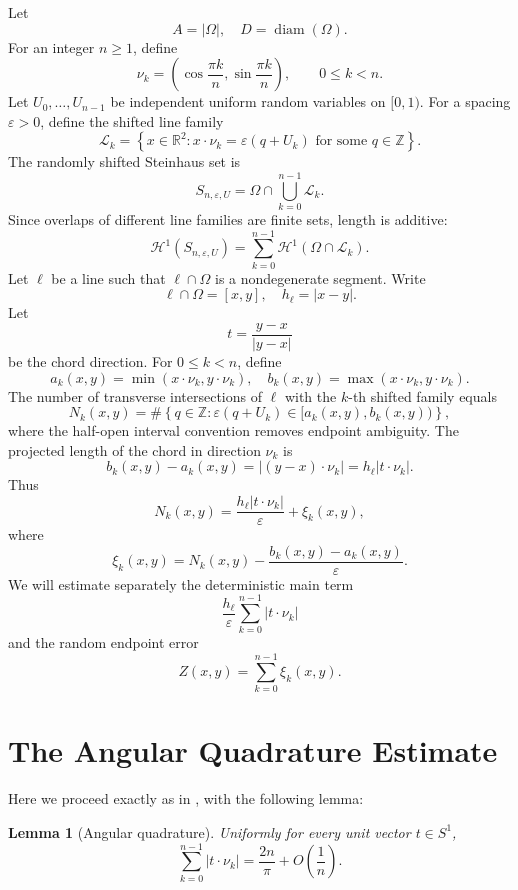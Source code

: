 \documentclass[11pt]{article}
\newtheorem{lemma}[theorem]{Lemma}
\newcommand{\R}{\mathbb R}
\newcommand{\Z}{\mathbb Z}
\newcommand{\cH}{\mathcal H}
\newcommand{\eps}{\varepsilon}
\newcommand{\diam}{\operatorname{diam}}
\begin{document}
Let
\[
        A=|\Omega|,
        \quad
        D=\diam(\Omega).
\]
For an integer $n\ge1$, define
\[
        \nu_k
        =
        \left(
        \cos\frac{\pi k}{n},
        \sin\frac{\pi k}{n}
        \right),
        \qquad
        0\le k<n.
\]
Let $U_0,\dots,U_{n-1}$ be independent uniform random variables on $[0,1)$. For a spacing $\eps>0$, define the shifted line family
\[
        \mathcal L_k
        =
        \left\{
        x\in\R^2:
        x\cdot\nu_k=\eps(q+U_k)
        \text{ for some }q\in\Z
        \right\}.
\]
The randomly shifted Steinhaus set is
\[
        S_{n,\eps,U}
        =
        \Omega\cap\bigcup_{k=0}^{n-1}\mathcal L_k.
\]
Since overlaps of different line families are finite sets, length is additive:
\[
        \cH^1(S_{n,\eps,U})
        =
        \sum_{k=0}^{n-1}
        \cH^1(\Omega\cap\mathcal L_k).
\]
Let $\ell$ be a line such that $\ell\cap\Omega$ is a nondegenerate segment. Write
\[
        \ell\cap\Omega=[x,y],
        \quad
        h_\ell=|x-y|.
\]
Let
\[
        t=\frac{y-x}{|y-x|}
\]
be the chord direction. For $0\le k<n$, define
\[
        a_k(x,y)=\min(x\cdot\nu_k,y\cdot\nu_k),
        \quad
        b_k(x,y)=\max(x\cdot\nu_k,y\cdot\nu_k).
\]
The number of transverse intersections of $\ell$ with the $k$-th shifted family equals
\[
        N_k(x,y)
        =
        \#\left\{
        q\in\Z:
        \eps(q+U_k)\in [a_k(x,y),b_k(x,y))
        \right\},
\]
where the half-open interval convention removes endpoint ambiguity. The projected length of the chord in direction $\nu_k$ is
\[
        b_k(x,y)-a_k(x,y)
        =
        |(y-x)\cdot\nu_k|
        =
        h_\ell |t\cdot\nu_k|.
\]
Thus
\[
        N_k(x,y)
        =
        \frac{h_\ell |t\cdot\nu_k|}{\eps}
        +
        \xi_k(x,y),
\]
where
\[
        \xi_k(x,y)
        =
        N_k(x,y)
        -
        \frac{b_k(x,y)-a_k(x,y)}{\eps}.
\]
We will estimate separately the deterministic main term
\[
        \frac{h_\ell}{\eps}\sum_{k=0}^{n-1}|t\cdot\nu_k|
\]
and the random endpoint error
\[
        Z(x,y)=\sum_{k=0}^{n-1}\xi_k(x,y).
\]

\section{The Angular Quadrature Estimate}
Here we proceed exactly as in \cite{SteinerbergerBuffon}, with the following lemma:

\begin{lemma}[Angular quadrature]\label{lem:angular}
Uniformly for every unit vector $t\in S^1$,
\[
        \sum_{k=0}^{n-1}|t\cdot\nu_k|
        =
        \frac{2n}{\pi}
        +
        O\left(\frac1n\right).
\]
\end{lemma}
\end{document}
